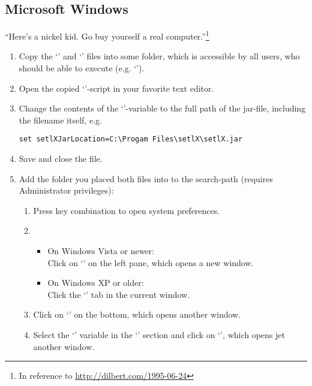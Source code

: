 \subsection{Microsoft Windows}

\begin{center}
\large
``Here's a nickel kid. Go buy yourself a real computer.''\footnote{In reference to \url{http://dilbert.com/1995-06-24}}
\end{center}

\begin{enumerate}
	\item Copy the `' and `' files into some folder, which is accessible by all users, who should be able to execute \setlX{} (e.g. `').
	\item Open the copied `'-script in your favorite text editor.
	\item Change the contents of the `'-variable to the full path of the jar-file, including the filename itself, e.g.
\begin{lstlisting}[frame=none,numbers=none]
set setlXJarLocation=C:\Progam Files\setlX\setlX.jar
\end{lstlisting}
	\item Save and close the file.
	\item Add the folder you placed both files into to the search-path (requires Administrator privileges):
	\begin{enumerate}
		\item Press \command{[Win]+[Pause]} key combination to open system preferences.
		\item 
		\begin{itemize}
			\item On Windows Vista or newer:\\Click on `' on the left pane, which opens a new window.
			\item On Windows XP or older:\\Click the `' tab in the current window.
		\end{itemize}
		\item Click on `' on the bottom, which opens another window.
		\item Select the `' variable in the `' section and click on `', which opens jet another window.

\end{enumerate}
\end{enumerate}
